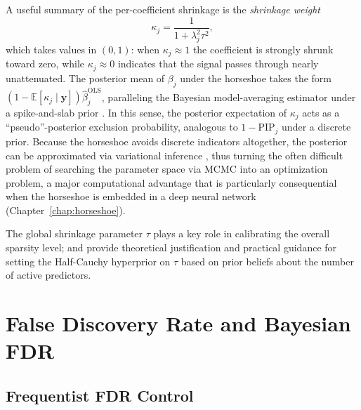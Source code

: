A useful summary of the per-coefficient
shrinkage is the \emph{shrinkage weight}
\begin{equation}
  \kappa_j = \frac{1}{1 + \lambda_j^2 \tau^2},
  \label{eq:kappa}
\end{equation}
which takes values in $(0, 1)$: when $\kappa_j \approx 1$ the
coefficient is strongly shrunk toward zero, while $\kappa_j \approx 0$
indicates that the signal passes through nearly unattenuated. The
posterior mean of $\beta_j$ under the horseshoe takes the form
$(1 - \mathbb{E}[\kappa_j \mid \mathbf{y}])\hat{\beta}_j^{\mathrm{OLS}}$,
paralleling the Bayesian model-averaging estimator under a
spike-and-slab prior \citep{carvalho_handling_2009, piironen_hyperprior_2017}. In this sense,
the posterior expectation of $\kappa_j$ acts as a
``pseudo''-posterior exclusion probability, analogous to
$1 - \mathrm{PIP}_j$ under a discrete prior. 
Because the horseshoe
avoids discrete indicators altogether, the posterior can be
approximated via variational inference
\citep{blei_variational_2017}, thus turning the often difficult problem of searching the parameter space via MCMC into an optimization problem, a major computational advantage that is
particularly consequential when the horseshoe is embedded in a deep
neural network (Chapter~\ref{chap:horseshoe}).

The global shrinkage parameter $\tau$ plays a key role in
calibrating the overall sparsity level; \citet{polson_half-cauchy_2012}
and \citet{piironen_hyperprior_2017} provide theoretical
justification and practical guidance for setting the Half-Cauchy
hyperprior on $\tau$ based on prior beliefs about the number of
active predictors.


\section{False Discovery Rate and Bayesian FDR}
\label{sec:intro-fdr}

\subsection{Frequentist FDR Control}
\label{subsec:fdr-freq}

